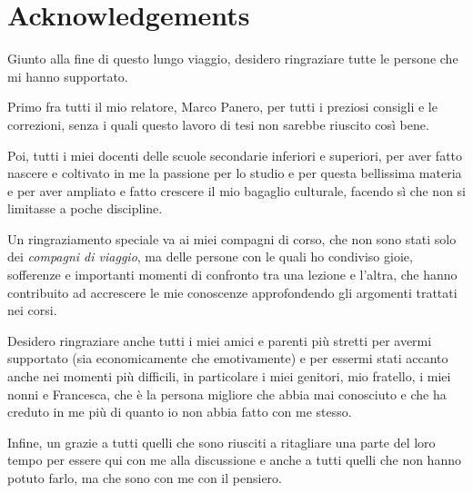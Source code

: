 \pagestyle{solopagina}
\renewcommand{\headrulewidth}{0.0pt}
\fancyhead{}
\fancyfoot{}

\section*{Acknowledgements}

Giunto alla fine di questo lungo viaggio, desidero ringraziare tutte le persone che mi hanno supportato.

Primo fra tutti il mio relatore, Marco Panero, per tutti i preziosi consigli e le correzioni, senza i quali questo lavoro di tesi non sarebbe riuscito così bene.

Poi, tutti i miei docenti delle scuole secondarie inferiori e superiori, per aver fatto nascere e coltivato in me la passione per lo studio e per questa bellissima materia e per aver ampliato e fatto crescere il mio bagaglio culturale, facendo sì che non si limitasse a poche discipline.

Un ringraziamento speciale va ai miei compagni di corso, che non sono stati solo dei \emph{compagni di viaggio}, ma delle persone con le quali ho condiviso gioie, sofferenze e importanti momenti di confronto tra una lezione e l'altra, che hanno contribuito ad accrescere le mie conoscenze approfondendo gli argomenti trattati nei corsi.

Desidero ringraziare anche tutti i miei amici e parenti più stretti per avermi supportato (sia economicamente che emotivamente) e per essermi stati accanto anche nei momenti più difficili, in particolare i miei genitori, mio fratello, i miei nonni e Francesca, che è la persona migliore che abbia mai conosciuto e che ha creduto in me più di quanto io non abbia fatto con me stesso.

Infine, un grazie a tutti quelli che sono riusciti a ritagliare una parte del loro tempo per essere qui con me alla discussione e anche a tutti quelli che non hanno potuto farlo, ma che sono con me con il pensiero.
